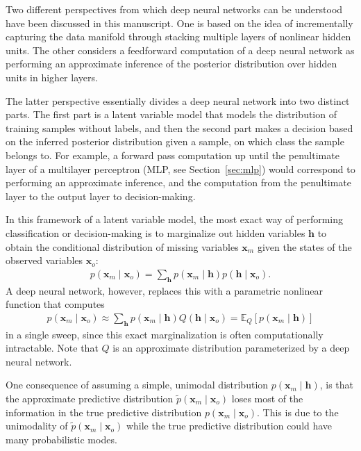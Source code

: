 \documentclass{now}
\newcommand{\vect}[1]{\mathbf{#1}}
\newcommand{\vh}[0]{\vect{h}}
\newcommand{\vx}[0]{\vect{x}}
\newcommand{\E}[0]{\mathbb{E}}
\begin{document}
Two different perspectives from which deep neural networks can be understood
have been discussed in this manuscript. One is based on the idea of incrementally
capturing the data manifold through stacking multiple layers of nonlinear hidden
units.  The other considers a feedforward computation of a deep neural network
as performing an approximate inference of the posterior distribution over hidden
units in higher layers.

The latter perspective essentially divides a deep neural network into two
distinct parts. The first part is a latent variable model that models the
distribution of training samples without labels, and then the second part makes
a decision based on the inferred posterior distribution given a sample, on which
class the sample belongs to. For example, a forward pass computation up until
the penultimate layer of a multilayer perceptron (MLP, see
Section~\ref{sec:mlp}) would correspond to performing an approximate inference,
and the computation from the penultimate layer to the output layer to
decision-making.

In this framework of a latent variable model, the most exact way of performing
classification or decision-making is to marginalize out hidden variables $\vh$
to obtain the conditional distribution of missing variables $\vx_m$ given the
states of the observed variables $\vx_o$:
\begin{align*}
    p(\vx_m \mid \vx_o) = \sum_{\vh} p(\vx_m \mid \vh) p(\vh \mid \vx_o).
\end{align*}
A deep neural network, however, replaces this with a parametric nonlinear
function that computes
\begin{align*}
    p(\vx_m \mid \vx_o) \approx  
    \sum_{\vh} p(\vx_m \mid
    \vh) Q(\vh \mid \vx_o) 
    = 
    \E_Q\left[p(\vx_m \mid
    \vh )\right]
\end{align*}
in a single sweep, since this exact marginalization is often computationally
intractable. Note that $Q$ is an approximate distribution parameterized by a
deep neural network.

One consequence of assuming a simple, unimodal distribution $p(\vx_m \mid \vh)$,
is that the approximate predictive distribution $\tilde{p}(\vx_m \mid \vx_o)$
loses most of the information in the true predictive distribution $p(\vx_m \mid
\vx_o)$. This is due to the unimodality of $\tilde{p}(\vx_m \mid \vx_o)$ while
the true predictive distribution could have many probabilistic modes.
\end{document}
